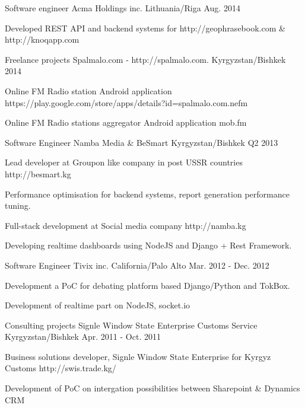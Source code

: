 \begin{cventries}
{\begin{cvitems}
      \end{cvitems}
    }
  \cventry
    {Software engineer}
    {Acma Holdings inc.}
    {Lithuania/Riga}
    {Aug. 2014}
    {
      \begin{cvitems}
        \item {Developed REST API and backend systems for http://geophrasebook.com \& http://knoqapp.com}
      \end{cvitems}
    }
  \cventry
    {Freelance projects}
    {Spalmalo.com - http://spalmalo.com.}
    {Kyrgyzstan/Bishkek}
    {2014}
    {
      \begin{cvitems}
        \item {Online FM Radio station Android application https://play.google.com/store/apps/details?id=spalmalo.com.nefm}
        \item {Online FM Radio stations aggregator Android application mob.fm}
      \end{cvitems}
    }
  \cventry
    {Software Engineer}
    {Namba Media \& BeSmart}
    {Kyrgyzstan/Bishkek}
    {Q2 2013}
    {
      \begin{cvitems}
        \item {Lead developer at Groupon like company in post USSR countries http://besmart.kg}
        \item {Performance optimisation for backend systems, report generation performance tuning.}
        \item {Full-stack development at Social media company http://namba.kg}
        \item {Developing realtime dashboards using NodeJS and Django + Rest Framework.}
      \end{cvitems}
    }
  \cventry
    {Software Engineer}
    {Tivix inc.}
    {California/Palo Alto}
    {Mar. 2012 - Dec. 2012}
    {
      \begin{cvitems}
        \item {Development a PoC for debating platform based Django/Python and TokBox.}
        \item {Development of realtime part on NodeJS, socket.io}
      \end{cvitems}
    }
  \cventry
    {Consulting projects}
    {Signle Window State Enterprise Customs Service}
    {Kyrgyzstan/Bishkek}
    {Apr. 2011 - Oct. 2011}
    {
      \begin{cvitems}
        \item {Business solutions developer, Signle Window State Enterprise for Kyrgyz Customs http://swis.trade.kg/}
        \item {Development of PoC on intergation possibilities between Sharepoint \& Dynamics CRM}
      \end{cvitems}
    }


\end{cventries}
